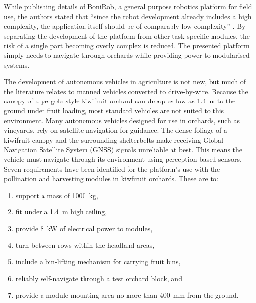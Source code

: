 \documentclass[preprint,authoryear,12pt]{elsarticle}
\begin{document}
    While publishing details of BoniRob, a general purpose robotics platform for field use, the authors stated that ``since the robot development already includes a high complexity, the application itself should be of comparably low complexity'' \citep{Ruckelshausen2009}.
    By separating the development of the platform from other task-specific modules, the risk of a single part becoming overly complex is reduced.
    The presented platform simply needs to navigate through orchards while providing power to modularised systems.

    The development of autonomous vehicles in agriculture is not new, but much of the literature relates to manned vehicles converted to drive-by-wire.
    Because the canopy of a pergola style kiwifruit orchard can droop as low as \SI{1.4}{\meter} to the ground under fruit loading, most standard vehicles are not suited to this environment.
    Many autonomous vehicles designed for use in orchards, such as vineyards, rely on satellite navigation for guidance.
    The dense foliage of a kiwifruit canopy and the surrounding shelterbelts make receiving Global Navigation Satellite System (GNSS) signals unreliable at best.
    This means the vehicle must navigate through its environment using perception based sensors.
    Seven requirements have been identified for the platform's use with the pollination and harvesting modules in kiwfiruit orchards.
    These are to:
    \begin{enumerate}
        \item support a mass of \SI{1000}{\kilo\gram},
        \item fit under a \SI{1.4}{\meter} high ceiling,
        \item provide \SI{8}{\kilo\watt} of electrical power to modules,
        \item turn between rows within the headland areas,
        \item include a bin-lifting mechanism for carrying fruit bins,
        \item reliably self-navigate through a test orchard block, and
        \item provide a module mounting area no more than \SI{400}{\milli\meter} from the ground.
    \end{enumerate}
\end{document}
